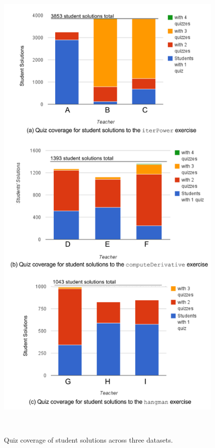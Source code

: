 {{\begin{figure}
\begin{minipage}{1\columnwidth}
\centering
\includegraphics[width=1.0\columnwidth]{Body/figures/foobaz/ComboQuizCoverageFigure2.png}
\caption{Quiz coverage of student solutions across three datasets.}~\label{fig:comboquizcoverage}
\end{minipage}


\end{figure}}}
